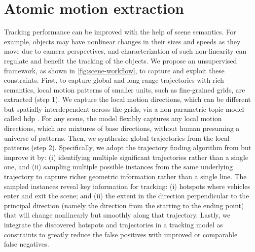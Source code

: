 \section{Atomic motion extraction}
\label{sec:scene-hdp}

Tracking performance can be improved with the help of scene semantics.
For example, objects may have nonlinear changes in their sizes and speeds as they move due to camera perspectives,
and characterization of such non-linearity can regulate and benefit the tracking of the objects.
We propose an unsupervised framework, as shown in \ref{fig:scene-workflow}, to capture and exploit these constraints.
First, to capture global and long-range trajectories
with rich semantics,
local motion patterns of smaller units, such as fine-grained grids, are extracted (step 1).
We capture the local motion directions, which can be different but spatially interdependent across the grids, via a non-parametric topic model called \gls{hdp} \cite{yee2006hierarchical,wang2009unsupervised}.
For any scene, the model flexibly captures any local motion directions,
which are mixtures of base directions, without human presuming a universe of patterns.
Then, we synthesize global trajectories from the local patterns (step 2).
Specifically,
we adopt the trajectory finding algorithm from \cite{wang2009unsupervised} but improve it by:
(i) identifying multiple significant trajectories rather than a single one, and
(ii) sampling multiple possible instances from the same underlying trajectory to capture richer geometric information rather than a single line.
The sampled instances reveal key information for tracking:
(i) hotspots where vehicles enter and exit the scene; and
(ii) the extent in the direction perpendicular to the principal direction
(namely the direction from the starting to the ending point)
that will change nonlinearly but smoothly along that trajectory.
Lastly, we integrate the discovered hotspots and trajectories
in a tracking model as constraints to greatly reduce the false positives with improved or comparable false negatives.

